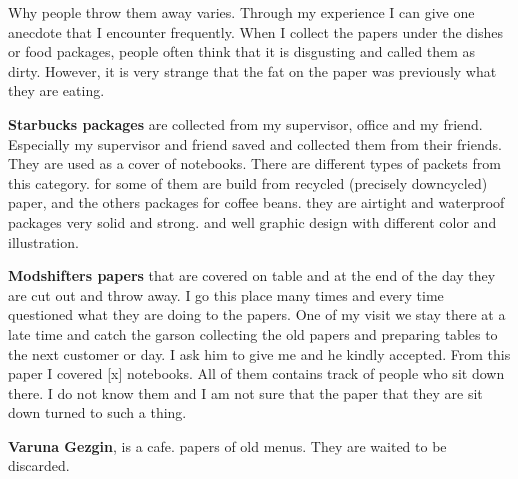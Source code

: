 Why people throw them away varies. Through my experience I can give one anecdote that I encounter frequently. When I collect the papers under the dishes or food packages, people often think that it is disgusting and called them as dirty. However, it is very strange that the fat on the paper was previously what they are eating.

\textbf{Starbucks packages} are collected from my supervisor, office and my friend. Especially my supervisor and friend saved and collected them from their friends. They are used as a cover of notebooks. There are different types of packets from this category. for some of them are build from recycled (precisely downcycled) paper, and the others packages for coffee beans. they are airtight and waterproof packages very solid and strong. and well graphic design with different color and illustration.

\textbf{Modshifters papers} that are covered on table and at the end of the day they are cut out and throw away. I go this place many times and every time questioned what they are doing to the papers. One of my visit we stay there at a late time and catch the garson collecting the old papers and preparing tables to the next customer or day. I ask him to give me and he kindly accepted. From this paper I covered [x] notebooks. All of them contains track of people who sit down there. I do not know them and I am not sure that the paper that they are sit down turned to such a thing.

\textbf{Varuna Gezgin}, is a cafe. papers of old menus. They are waited to be discarded. 

